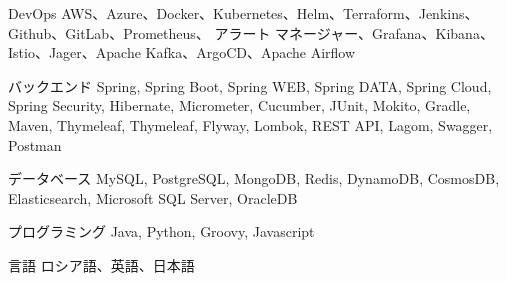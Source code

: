 

\begin{cvskills}

  \cvskill
    {DevOps} %
    {AWS、Azure、Docker、Kubernetes、Helm、Terraform、Jenkins、Github、GitLab、Prometheus、
      アラート マネージャー、Grafana、Kibana、Istio、Jager、Apache Kafka、ArgoCD、Apache Airflow} %

  \cvskill
    {バックエンド} %
    {Spring, Spring Boot, Spring WEB, Spring DATA, Spring Cloud, Spring Security, Hibernate, 
    Micrometer, Cucumber, JUnit, Mokito, Gradle, Maven, Thymeleaf, Thymeleaf, Flyway, Lombok, REST API, Lagom, Swagger, Postman} %

  \cvskill
    {データベース} %
    {MySQL, PostgreSQL, MongoDB, Redis, DynamoDB, CosmosDB, Elasticsearch,  Microsoft SQL Server, OracleDB} %

  \cvskill
    {プログラミング} %
    {Java, Python, Groovy, Javascript} %

  \cvskill
    {言語} %
    {ロシア語、英語、日本語} %

\end{cvskills}
